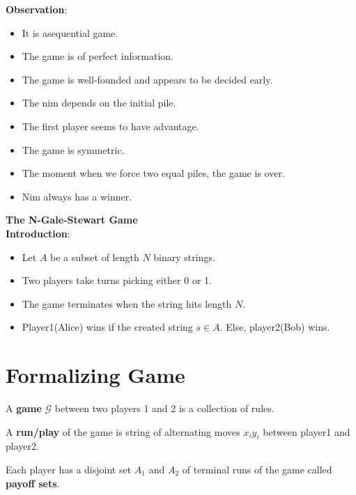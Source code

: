 \textbf{Observation}:
\begin{itemize}
    \item It is asequential game.
    \item The game is of perfect information.
    \item The game is well-founded and appears to be decided early.
    \item The nim depends on the initial pile.
    \item The first player seems to have advantage.
    \item The game is symmetric.
    \item The moment when we force two equal piles, the game is over.
    \item Nim always has a winner.
\end{itemize}


\noindent \textbf{The N-Gale-Stewart Game}\\

\textbf{Introduction}:
\begin{itemize}
    \item Let $A$ be a subset of length $N$ binary strings.
    \item Two players take turns picking either 0 or 1.
    \item The game terminates when the string hits length $N$.
    \item Player1(Alice) wins if the created string $s \in A$. Else, player2(Bob) wins.
\end{itemize}


\section{Formalizing Game}

\begin{definition}
    A \textbf{game} $\mathcal{G}$ between two players 1 and 2 is a collection of rules.
\end{definition}

\begin{definition}
    A \textbf{run/play} of the game is string of alternating moves $x_iy_i$ between player1 and player2.
\end{definition}

\begin{definition}
    Each player has a disjoint set $A_1$ and $A_2$ of terminal runs of the game called \textbf{payoff sets}.
\end{definition}

